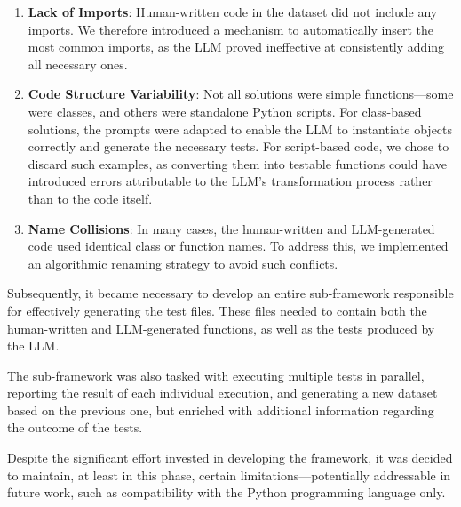 \begin{enumerate}
    \item \textbf{Lack of Imports}: Human-written code in 
    the dataset did not include any imports. We therefore 
    introduced a mechanism to automatically insert the most 
    common imports, as the LLM proved ineffective at 
    consistently adding all necessary ones.
    
    \item \textbf{Code Structure Variability}: Not all 
    solutions were simple functions—some were classes, 
    and others were standalone Python scripts. For 
    class-based solutions, the prompts were adapted to 
    enable the LLM to instantiate objects correctly and 
    generate the necessary tests. For script-based code, 
    we chose to discard such examples, as converting 
    them into testable functions could have introduced 
    errors attributable to the LLM's transformation 
    process rather than to the code itself.
    
    \item \textbf{Name Collisions}: In many cases, 
    the human-written and LLM-generated code used 
    identical class or function names. To address this, 
    we implemented an algorithmic renaming strategy to 
    avoid such conflicts.
\end{enumerate}

Subsequently, it became necessary to develop an 
entire sub-framework responsible for effectively 
generating the test files. These files needed to 
contain both the human-written and LLM-generated 
functions, as well as the tests produced by the LLM.

The sub-framework was also tasked with executing 
multiple tests in parallel, reporting the result of 
each individual execution, and generating a new dataset 
based on the previous one, but enriched with additional 
information regarding the outcome of the tests.

Despite the significant effort invested in 
developing the framework, it was decided to maintain, 
at least in this phase, certain limitations—potentially 
addressable in future work, such as compatibility with the 
Python programming language only.